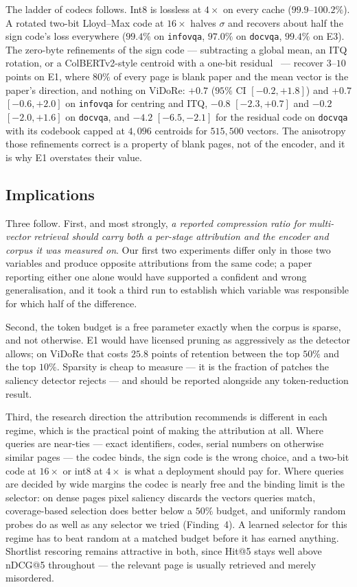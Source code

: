 \documentclass[conference]{IEEEtran}
\begin{document}
The ladder of codecs follows. Int8 is lossless at $4\times$ on every cache
($99.9$--$100.2\%$). A rotated two-bit Lloyd--Max code at $16\times$ halves
$\sigma$ and recovers about half the sign code's loss everywhere ($99.4\%$ on
\texttt{infovqa}, $97.0\%$ on \texttt{docvqa}, $99.4\%$ on E3). The zero-byte
refinements of the sign code --- subtracting a global mean, an ITQ rotation, or
a ColBERTv2-style centroid with a one-bit residual~\cite{colbertv2} --- recover
$3$--$10$ points on E1, where $80\%$ of every page is blank paper and the mean
vector is the paper's direction, and nothing on ViDoRe: $+0.7$ ($95\%$ CI
$[-0.2, +1.8]$) and $+0.7$ $[-0.6, +2.0]$ on \texttt{infovqa} for centring and
ITQ, $-0.8$ $[-2.3, +0.7]$ and $-0.2$ $[-2.0, +1.6]$ on \texttt{docvqa}, and
$-4.2$ $[-6.5, -2.1]$ for the residual code on \texttt{docvqa} with its codebook
capped at $4{,}096$ centroids for $515{,}500$ vectors. The anisotropy those
refinements correct is a property of blank pages, not of the encoder, and it is
why E1 overstates their value.

\subsection{Implications}
Three follow. First, and most strongly, \emph{a reported compression ratio for
multi-vector retrieval should carry both a per-stage attribution and the encoder
and corpus it was measured on}. Our first two experiments differ only in those two
variables and produce opposite attributions from the same code; a paper reporting
either one alone would have supported a confident and wrong generalisation, and
it took a third run to establish which variable was responsible for which half
of the difference.

Second, the token budget is a free parameter exactly when the corpus is sparse,
and not otherwise. E1 would have licensed pruning as aggressively as the detector
allows; on ViDoRe that costs $25.8$ points of retention between the top $50\%$
and the top $10\%$. Sparsity is cheap to measure --- it is the fraction of
patches the saliency detector rejects --- and should be reported alongside any
token-reduction result.

Third, the research direction the attribution recommends is different in each
regime, which is the practical point of making the attribution at all. Where
queries are near-ties --- exact identifiers, codes, serial numbers on otherwise
similar pages --- the codec binds, the sign code is the wrong choice, and a
two-bit code at $16\times$ or int8 at $4\times$ is what a deployment should pay
for. Where queries are decided by wide margins the codec is nearly free and the
binding limit is the selector: on dense pages pixel saliency discards the
vectors queries match, coverage-based selection does better below a $50\%$
budget, and uniformly random probes do as well as any selector we tried
(Finding~4). A learned selector for this regime has to beat random at a matched
budget before it has earned anything. Shortlist rescoring remains attractive in
both, since Hit@5 stays well above nDCG@5 throughout --- the relevant page is
usually retrieved and merely misordered.
\end{document}
